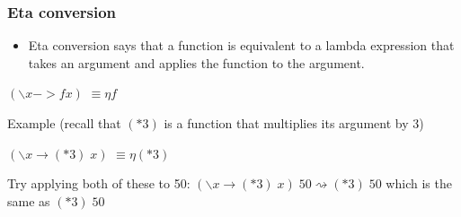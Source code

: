 \documentclass{beamer}
\newcommand{\etaconv}{\hbox{\quad$\equiv\eta$\quad}}
\begin{document}
\begin{frame}[fragile]
\frametitle{Eta conversion}

\begin{itemize}
\item Eta conversion says that a function is equivalent to a lambda
  expression that takes an argument and applies the function to the
  argument.
\end{itemize}

$(\backslash x -> f x)$ \etaconv $f$

\vspace{2em}

Example (recall that $(*3)$ is a function that multiplies its
argument by 3)
\vspace{0.5em}

$(\backslash x \rightarrow (*3) \;x)$ \etaconv $(*3)$

\vspace{0.5em}
Try applying both of these to 50:
\vspace{0.5em}
$(\backslash x \rightarrow (*3) \;x) \;50\rightsquigarrow (*3) \; 50$ which is the same as $(*3) \;50$

\end{frame}
\end{document}
